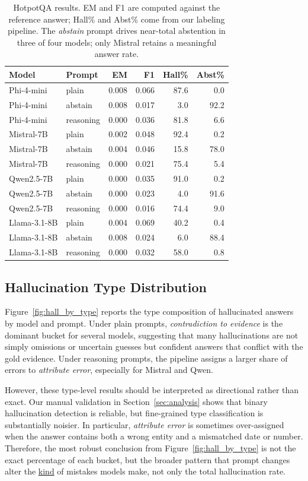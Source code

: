 \documentclass[11pt,a4paper]{article}
\renewcommand{\emph}[1]{\uline{#1}}
\newcommand{\lbl}[1]{\textit{#1}}
\begin{document}
\begin{table}[h!]
\centering
\small
\begin{tabular}{llrrrr}
\hline
Model & Prompt & EM & F1 & Hall\% & Abst\%\\
\hline
Phi-4-mini    & plain     & 0.008 & 0.066 & 87.6 & 0.0\\
Phi-4-mini    & abstain   & 0.008 & 0.017 & 3.0 & 92.2\\
Phi-4-mini    & reasoning & 0.000 & 0.036 & 81.8 & 6.6\\
Mistral-7B    & plain     & 0.002 & 0.048 & 92.4 & 0.2\\
Mistral-7B    & abstain   & 0.004 & 0.046 & 15.8 & 78.0\\
Mistral-7B    & reasoning & 0.000 & 0.021 & 75.4 & 5.4\\
Qwen2.5-7B    & plain     & 0.000 & 0.035 & 91.0 & 0.2\\
Qwen2.5-7B    & abstain   & 0.000 & 0.023 & 4.0 & 91.6\\
Qwen2.5-7B    & reasoning & 0.000 & 0.016 & 74.4 & 9.0\\
Llama-3.1-8B  & plain     & 0.004 & 0.069 & 40.2 & 0.4\\
Llama-3.1-8B  & abstain   & 0.008 & 0.024 & 6.0 & 88.4\\
Llama-3.1-8B  & reasoning & 0.000 & 0.032 & 58.0 & 0.8\\
\hline
\end{tabular}
\caption{HotpotQA results. EM and F1 are computed against the reference answer; Hall\% and Abst\% come from our labeling pipeline. The \lbl{abstain} prompt drives near-total abstention in three of four models; only Mistral retains a meaningful answer rate.}
\label{tab:hall_rate}
\end{table}

\subsection{Hallucination Type Distribution}

Figure~\ref{fig:hall_by_type} reports the type composition of hallucinated answers by model and prompt. Under plain prompts, \lbl{contradiction to evidence} is the dominant bucket for several models, suggesting that many hallucinations are not simply omissions or uncertain guesses but confident answers that conflict with the gold evidence. Under reasoning prompts, the pipeline assigns a larger share of errors to \lbl{attribute error}, especially for Mistral and Qwen.

However, these type-level results should be interpreted as directional rather than exact. Our manual validation in Section~\ref{sec:analysis} shows that binary hallucination detection is reliable, but fine-grained type classification is substantially noisier. In particular, \lbl{attribute error} is sometimes over-assigned when the answer contains both a wrong entity and a mismatched date or number. Therefore, the most robust conclusion from Figure~\ref{fig:hall_by_type} is not the exact percentage of each bucket, but the broader pattern that prompt changes alter the \emph{kind} of mistakes models make, not only the total hallucination rate.
\end{document}
